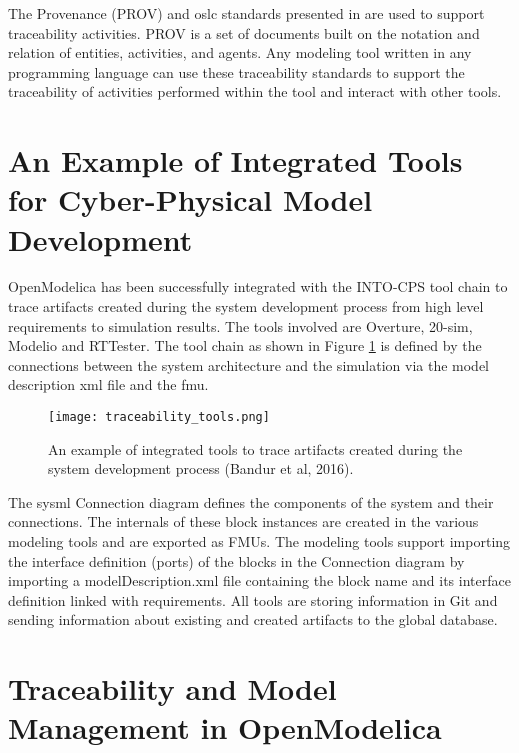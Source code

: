 The Provenance (PROV) \cite{provluc} and \acrshort{oslc} standards presented in \cite{intocpsjohn}
are used to support traceability activities. PROV is a set of documents built on the notation and relation of
entities, activities, and agents. Any modeling tool written in any programming language can use these traceability standards to support
the traceability of activities performed within the tool and interact with other tools.

\section{An Example of Integrated Tools for Cyber-Physical Model Development}
\label{sec:tracaebilitytools}

OpenModelica has been successfully integrated with the INTO-CPS tool chain to trace artifacts created
during the system development process from high level requirements to simulation results. The tools involved
are Overture, 20-sim, Modelio and RTTester. The tool chain as shown in Figure \ref{fig:traceabilitytools} is defined by the connections between the system architecture and the simulation via the model description \acrshort{xml} file and the \acrshort{fmu}.

\begin{landscape} 
 \begin{figure}
  \texttt{[image: traceability\_tools.png]}
  \caption{An example of integrated tools to trace artifacts created during the system development process (Bandur et al, 2016).}
  \label{fig:traceabilitytools}  
 \end{figure} 
\end{landscape} 

The \acrshort{sysml} Connection diagram defines the components of the system and their connections. The
internals of these block instances are created in the various modeling tools and are exported as FMUs. 
The modeling tools support importing the interface definition (ports) of the blocks in the Connection
diagram by importing a modelDescription.xml file containing the block name and its interface definition
linked with requirements. All tools are storing information in Git and sending information about
existing and created artifacts to the global database.
 
\section{Traceability and Model Management in OpenModelica}
\label{sec:tracaebilityactivities} 

